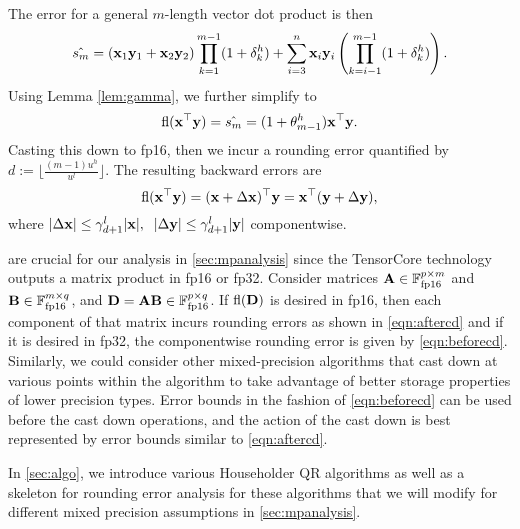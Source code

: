The error for a general $m$-length vector dot product is then
\begin{equation}
\label{eqn:dperr_2}
\hat{s_m} = (\bb{x}_1\bb{y}_1+\bb{x}_2\bb{y}_2)\prod_{k=1}^{m-1}(1+\dd_{k}^h) + \sum_{i=3}^n \bb{x}_i\bb{y}_i\left(\prod_{k=i-1}^{m-1}(1+\dd_{k}^{h})\right).
\end{equation}
Using Lemma \ref{lem:gamma}, we further simplify to
\begin{equation}
\fl(\bb{x}^{\top}\bb{y}) = \hat{s_m} = (1+\tth^h_{m-1})\bb{x}^{\top}\bb{y}. \label{eqn:beforecd}
\end{equation}
Casting this down to fp16, then we incur a rounding error quantified by $d:=\lfloor\frac{(m-1)u^h}{u^l}\rfloor$. 
The resulting backward errors are
\begin{equation}
\fl(\bb{x}^{\top}\bb{y}) = (\bb{x}+\Delta\bb{x})^{\top}\bb{y} = \bb{x}^{\top}(\bb{y}+\Delta\bb{y}), \label{eqn:aftercd}
\end{equation}
where $|\Delta \mathbf{x}| \leq \gamma^l_{d+1}|\mathbf{x}|,\;\; |\Delta \mathbf{y}|  \leq \gamma_{d+1}^l|\mathbf{y}| $ componentwise.\par

 are crucial for our analysis in \cref{sec:mpanalysis} since the TensorCore technology outputs a matrix product in fp16 or fp32. 
Consider matrices $\mathbf{A}\in\mathbb{F}_{\text{fp16}}^{p\times m}$ and $\mathbf{B}\in\mathbb{F}_{\text{fp16}}^{m\times q}$, and $\mathbf{D}=\mathbf{A}\mathbf{B}\in\mathbb{F}_{\text{fp16}}^{p\times q}$.
If $\mathrm{fl}(\mathbf{D})$ is desired in fp16, then each component of that matrix incurs rounding errors as shown in \cref{eqn:aftercd} and if it is desired in fp32, the componentwise rounding error is given by \cref{eqn:beforecd}.
Similarly, we could consider other mixed-precision algorithms that cast down at various points within the algorithm to take advantage of better storage properties of lower precision types. 
Error bounds in the fashion of \cref{eqn:beforecd} can be used before the cast down operations, and the action of the cast down is best represented by error bounds similar to \cref{eqn:aftercd}.\par

In \cref{sec:algo}, we introduce various Householder QR algorithms as well as a skeleton for rounding error analysis for these algorithms that we will modify for different mixed precision assumptions in \cref{sec:mpanalysis}.